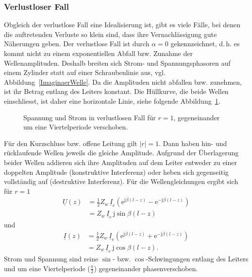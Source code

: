 \documentclass[paper=a4, parskip=half-, ngerman, fontsize=11pt]{scrreprt}
\begin{document}
\subsubsection{Verlustloser Fall}
Obgleich der verlustlose Fall eine Idealisierung ist, gibt es viele Fälle, bei denen die auftretenden Verluste so klein
sind, dass ihre Vernachlässigung gute Näherungen geben. Der verlustlose Fall ist durch $\alpha = 0$ gekennzeichnet,
d.\,h. es kommt nicht zu einem exponentiellen Abfall bzw. Zunahme der Wellenamplituden. Deshalb breiten sich Strom- und
Spannungsphasoren auf einem Zylinder statt auf einer Schraubenlinie aus, vgl.\,Abbildung~\ref{ImaginaerWelle}. Da die
Amplituden nicht abfallen bzw. zunehmen, ist ihr Betrag entlang des Leiters konstant. Die Hüllkurve, die beide Wellen
einschliesst, ist daher eine horizontale Linie, siehe folgende Abbildung~\ref{VerlustlosBetrag}.
\begin{figure}[!htb]
    \begin{center}
        
        \caption{Spannung und Strom in verlustlosen Fall für $r = 1$, gegeneinander um eine Viertelperiode verschoben.}
        \label{VerlustlosBetrag}
    \end{center}
\end{figure}
Für den Kurzschluss bzw. offene Leitung gilt $|r|=1$. Dann haben hin- und rücklaufende Wellen jeweils die gleiche
Amplitude. Aufgrund der Überlagerung beider Wellen addieren sich ihre Amplituden auf dem Leiter entweder zu einer
doppelten Amplitude (konstruktive Interferenz) oder heben sich gegenseitig vollständig auf (destruktive Interferenz).
Für die Wellengleichungen ergibt sich für $r = 1$
\begin{align*}
\underline{U}(z) &= \frac{1}{2} Z_{w} \, \underline{I}_{e}
\left( \mathrm{e}^{\mathrm{j} \beta (l - z)} - \mathrm{e}^{- \mathrm{j} \beta (l - z)} \right) \\[1ex]
&= Z_{w} \, \underline{I}_{e} \, \mathrm{j} \sin \beta (l - z)
\end{align*}
und
\begin{align*}
    \underline{I}(z) &= \frac{1}{2} Z_{w} \, \underline{I}_{e}
    \left( \mathrm{e}^{\mathrm{j} \beta (l - z)} + \mathrm{e}^{- \mathrm{j} \beta (l - z)} \right) \\[1ex]
    &= Z_{w} \, \underline{I}_{e} \, \mathrm{j} \cos \beta (l - z).
\end{align*}
Strom und Spannung sind reine $\sin$- bzw. $\cos$-Schwingungen entlang des Leiters und um eine Viertelperiode
($\frac{\pi}{2}$) gegeneinander phasenverschoben.
\end{document}

